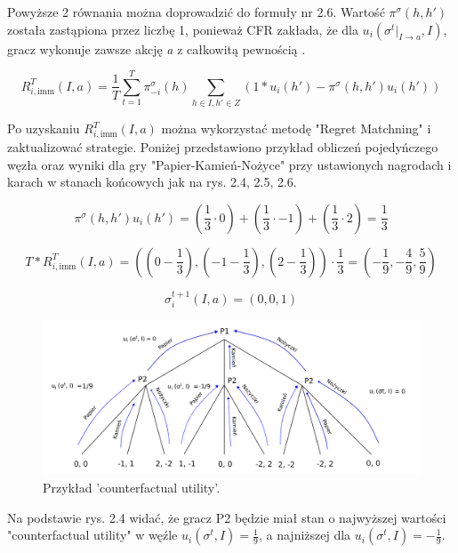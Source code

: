 \documentclass[12pt,oneside,a4paper]{report}
\begin{document}
Powyższe 2 równania można doprowadzić do formuły nr 2.6. Wartość $\pi^{\sigma} (h,h')$ została
zastąpiona przez liczbę 1, ponieważ
CFR zakłada, że dla $u_{i}(\sigma^{t}|_{I \rightarrow a}, I)$, gracz wykonuje zawsze akcję \emph{a} 
z całkowitą pewnością \cite{CFR}.



\begin{equation}
   R^{T}_{i,\text{imm}} (I, a) = \frac{1}{T} \sum^{T}_{t=1}
   \pi_{-i}^{\sigma}(h)\sum_{h \in I, h' \in Z}(1*u_{i}(h') - \pi^{\sigma}(h,h')u_{i}(h'))
\end{equation}


\vspace{0.5cm}
Po uzyskaniu $R^{T}_{i,\text{imm}} (I, a)$ można wykorzystać metodę "Regret Matchning" i
zaktualizować strategie.
Poniżej przedstawiono przykład obliczeń pojedyńczego węzła oraz wyniki 
dla gry "Papier-Kamień-Nożyce" przy ustawionych
nagrodach i karach w stanach końcowych jak na rys. 2.4, 2.5, 2.6.

\begin{center}
$$
   \pi^{\sigma}(h,h')u_{i}(h') =  (\frac{1}{3} \cdot 0) + (\frac{1}{3} \cdot -1) +
   (\frac{1}{3} \cdot 2) = \frac{1}{3}
$$

$$
T*R^{T}_{i,\text{imm}} (I, a) =
((0-\frac{1}{3}), (-1-\frac{1}{3}), (2-\frac{1}{3})) \cdot \frac{1}{3}= (-\frac{1}{9},
-\frac{4}{9}, \frac{5}{9}) 
$$

$$
\sigma^{t+1}_{i}\left(I, a \right) = (0, 0, 1)
$$
\end{center}
\vspace{0.5cm}


\begin{figure}[th!]
            \center
           \includegraphics[width=1\textwidth]{./img/drawing2.pdf}
           \caption{Przykład 'counterfactual utility'.}
\end{figure}

Na podstawie rys. 2.4 widać, że gracz P2 będzie miał stan o najwyższej wartości "counterfactual utility" w węźle $u_{i}
(\sigma^{t}, I)=\frac{1}{9}$, a najniższej dla $u_{i}(\sigma^{t}, I)=-\frac{1}{9}$.
\end{document}

